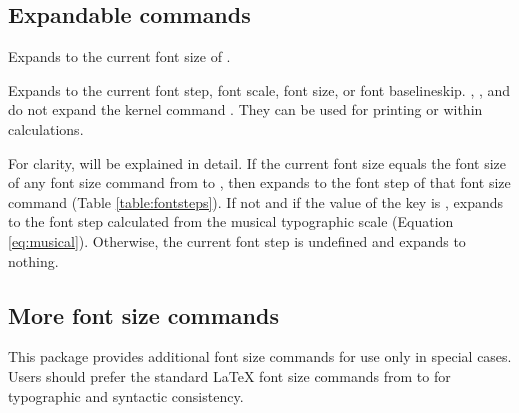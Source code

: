 \documentclass{beery}
\begin{document}
\subsection{Expandable commands}
\label{subsec:expandable}

\begin{displaycode}
\end{displaycode}

Expands to the current font size of .

\begin{displaycode}
  \nopagebreak\newline
  \newline
  \nopagebreak\newline
\end{displaycode}

Expands to the current font step, font scale, font size, or font baselineskip.
, , and  do not expand the kernel command .
They can be used for printing or within calculations.

For clarity,  will be explained in detail.
If the current font size equals the font size of any font size command from  to , then  expands to the font step of that font size command (Table \ref{table:fontsteps}).
If not and if the value of the key  is ,  expands to the font step calculated from the musical typographic scale (Equation \ref{eq:musical}).
Otherwise, the current font step is undefined and  expands to nothing.

\subsection{More font size commands}
\label{subsec:fontsize}

This package provides additional font size commands for use only in special cases.
Users should prefer the standard \LaTeX{} font size commands from  to  for typographic and syntactic consistency.

\begin{displaycode}
   \sarg{} 
\end{displaycode}
\end{document}
